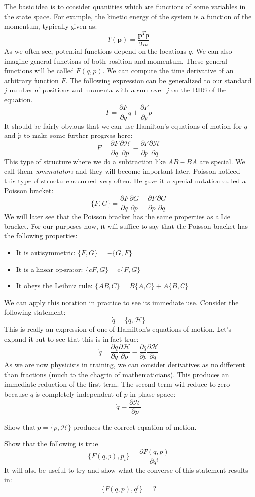 The basic idea is to consider quantities which are functions of some variables in the state space. For example, the kinetic energy of the system is a function of the momentum, typically given as:
$$T(\bm{p})=\frac{\bm{p}^T\bm{p}}{2m}$$
As we often see, potential functions depend on the locations $q$. We can also imagine general functions of both position and momentum. These general functions will be called $F(q,p)$. We can compute the time derivative of an arbitrary function $F$. The following expression can be generalized to our standard $j$ number of positions and momenta with a sum over $j$ on the RHS of the equation.
$$\dot{F}=\frac{\partial F}{\partial {q}}\dot{q}+\frac{\partial F}{\partial p}\dot{p}$$
It should be fairly obvious that we can use Hamilton's equations of motion for $\dot{q}$ and $\dot{p}$ to make some further progress here:
$$\dot{F}=\frac{\partial F}{\partial {q}}\frac{\partial \mathcal{H}}{\partial {p}}-\frac{\partial F}{\partial p}\frac{\partial \mathcal{H}}{\partial {q}}$$
This type of structure where we do a subtraction like $AB-BA$ are special. We call them \textit{commutators} and they will become important later. Poisson noticed this type of structure occurred very often. He gave it a special notation called a Poisson bracket:
$$\{F,G\}=\frac{\partial F}{\partial {q}}\frac{\partial G}{\partial {p}}-\frac{\partial F}{\partial p}\frac{\partial G}{\partial {q}}$$
We will later see that the Poisson bracket has the same properties as a Lie bracket. For our purposes now, it will suffice to say that the Poisson bracket has the following properties:
\begin{itemize}
    \item It is antisymmetric: $\{F,G\}=-\{G,F\}$
    \item It is a linear operator: $\{cF,G\}=c\{F,G\}$
    \item It obeys the Leibniz rule: $\{AB,C\}=B\{A,C\}+A\{B,C\}$
\end{itemize}

We can apply this notation in practice to see its immediate use. Consider the following statement:
$$\dot{q}=\{q,\mathcal{H}\}$$
This is really an expression of one of Hamilton's equations of motion. Let's expand it out to see that this is in fact true:
$$\dot{q}=\frac{\partial q}{\partial {q}}\frac{\partial \mathcal{H}}{\partial {p}}-\frac{\partial q}{\partial p}\frac{\partial \mathcal{H}}{\partial {q}}$$
As we are now physicists in training, we can consider derivatives as no different than fractions (much to the chagrin of mathematicians). This produces an immediate reduction of the first term. The second term will reduce to zero because $q$ is completely independent of $p$ in phase space:
$$\dot{q}=\frac{\partial \mathcal{H}}{\partial {p}}$$
\begin{exercise}
Show that $\dot{p}=\{p,\mathcal{H}\}$ produces the correct equation of motion.
\end{exercise}
\begin{exercise}
Show that the following is true$$\{F(q,p),p_i\}=\frac{\partial F(q,p)}{\partial q^i}$$
It will also be useful to try and show what the converse of this statement results in:
$$\{F(q,p),q^i\}=\ ?$$
\end{exercise}

